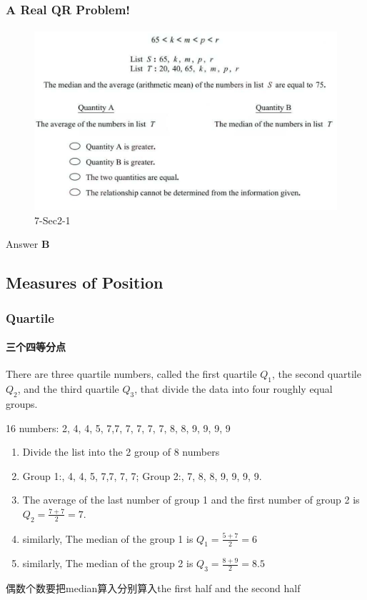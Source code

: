 \documentclass[
	11pt, %
]{beamer}
\begin{document}

\begin{frame}
	\frametitle{A Real QR Problem!}
	\framesubtitle{}
	\begin{figure}
		\includegraphics[width=\linewidth]{Median.png}
		\caption{7-Sec2-1}
	\end{figure}
	\pause
 \pause
\bigskip
Answer \textbf{B } 
\end{frame}



\subsection{Measures of Position}


\begin{frame}
	\frametitle{Quartile}
	\framesubtitle{三个四等分点}
	\begin{definition}
	There are three
quartile numbers, called the first quartile $Q_1$, the second quartile $Q_2$, and the third
quartile $Q_3$, that divide the data into four roughly equal groups.
	\end{definition}
	\begin{example}
	16 numbers: 2, 4, 4, 5, 7,7, 7, 7, 7, 7, 8, 8, 9, 9, 9, 9\\
	\begin{enumerate}
		\item Divide the list into  the 2 group of 8 numbers
		\item Group 1:, 4, 4, 5, 7,7, 7, 7;   Group 2:, 7, 8, 8, 9, 9, 9, 9.
		\item The average of the last number of group 1 and the first number of group 2 is $Q_2=\frac{7+7}{2}=7$.
		\item similarly, The median of the group 1 is $Q_1=\frac{5+7}{2}=6$
		\item similarly, The median of the group 2 is $Q_3=\frac{8+9}{2}=8.5$
	\end{enumerate}
		\alert{偶数个数要把median算入分别算入the first half and the second half}

	\end{example}
\end{frame}
\end{document}
